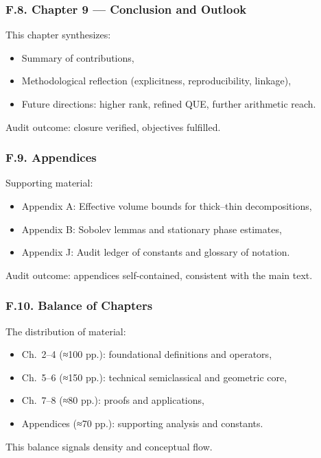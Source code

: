 \subsubsection*{F.8. Chapter 9 — Conclusion and Outlook}
This chapter synthesizes:
\begin{itemize}
  \item Summary of contributions,
  \item Methodological reflection (explicitness, reproducibility, linkage),
  \item Future directions: higher rank, refined QUE, further arithmetic reach.
\end{itemize}
Audit outcome: closure verified, objectives fulfilled.

\subsubsection*{F.9. Appendices}
Supporting material:
\begin{itemize}
  \item Appendix A: Effective volume bounds for thick–thin decompositions,
  \item Appendix B: Sobolev lemmas and stationary phase estimates,
  \item Appendix J: Audit ledger of constants and glossary of notation.
\end{itemize}
Audit outcome: appendices self-contained, consistent with the main text.

\subsubsection*{F.10. Balance of Chapters}
The distribution of material:
\begin{itemize}
  \item Ch.~2–4 (≈100 pp.): foundational definitions and operators,
  \item Ch.~5–6 (≈150 pp.): technical semiclassical and geometric core,
  \item Ch.~7–8 (≈80 pp.): proofs and applications,
  \item Appendices (≈70 pp.): supporting analysis and constants.
\end{itemize}
This balance signals density and conceptual flow.


